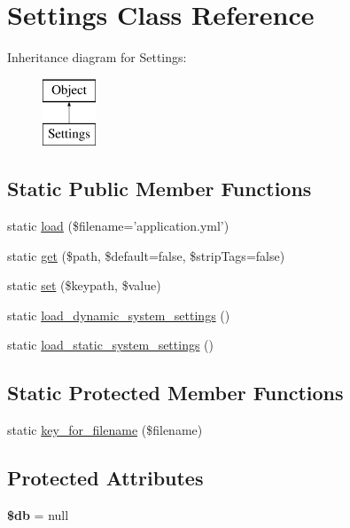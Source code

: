 \hypertarget{class_settings}{
\section{Settings Class Reference}
\label{class_settings}
}
Inheritance diagram for Settings:\begin{figure}[H]
\begin{center}
\leavevmode
\includegraphics[height=2.000000cm]{class_settings}
\end{center}
\end{figure}
\subsection*{Static Public Member Functions}
\begin{DoxyCompactItemize}
\item 
static \hyperlink{class_settings_a188513ac11fe0fc442bef24c8776ba9a}{load} (\$filename='application.yml')
\item 
static \hyperlink{class_settings_aa46e913ae35c7d80d002e6f967540ee7}{get} (\$path, \$default=false, \$stripTags=false)
\item 
static \hyperlink{class_settings_aa265fe478185efac9de90d1f4744ce16}{set} (\$keypath, \$value)
\item 
static \hyperlink{class_settings_af8f0418d8d97580c98e7f669b87cdb84}{load\_\-dynamic\_\-system\_\-settings} ()
\item 
static \hyperlink{class_settings_a3b975848e892d541b541421589d7fb0e}{load\_\-static\_\-system\_\-settings} ()
\end{DoxyCompactItemize}
\subsection*{Static Protected Member Functions}
\begin{DoxyCompactItemize}
\item 
static \hyperlink{class_settings_a24d8a49ce0ab4d4bca3acb8552056d07}{key\_\-for\_\-filename} (\$filename)
\end{DoxyCompactItemize}
\subsection*{Protected Attributes}
\begin{DoxyCompactItemize}
\item 
\hypertarget{class_object_a1fa3127fc82f96b1436d871ef02be319}{
{\bfseries \$db} = null}
\label{class_object_a1fa3127fc82f96b1436d871ef02be319}

\end{DoxyCompactItemize}


